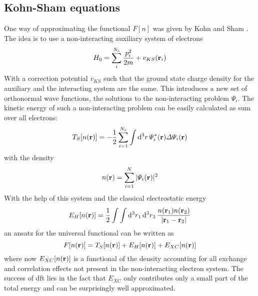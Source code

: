 \documentclass[main.tex]{subfiles}
\begin{document}
\subsection{Kohn-Sham equations}

One way of approximating the functional \(F[n]\) was given by Kohn and Sham \cite{kohn_self-consistent_1965}.
The idea is to use a non-interacting auxiliary system of electrons 
\begin{equation}
    H_0 = \sum_i^{N_e} \frac{p_i^2}{2m} + v_{KS} (\vb{r}_i)
\end{equation}
With a correction potential \(v_{KS}\) such that the ground state charge density for the auxiliary and the interacting system are the same.
This introduces a new set of orthonormal wave functions, the solutions to the non-interacting problem \(\Psi_i\).
The kinetic energy of such a non-interacting problem can be easily calculated as sum over all electrons:
\begin{equation}
    T_S [n(\vb{r})] = - \frac{1}{2} \sum_{i=1}^{N_e} \int \dd[3]{r} \Psi_i^* (\vb{r}) \Delta \Psi_i (\vb{r})
\end{equation}
with the density
\begin{equation}\label{eq:density_ks_states}
    n(\vb{r}) = \sum_{i=1}^N \vert \Psi_i (\vb{r}) \vert^2
\end{equation}
With the help of this system and the classical electrostatic energy 
\begin{equation}
    E_H [n(\vb{r})] = \frac{1}{2} \int \int \dd[3]{r_1} \dd[3]{r_2} \frac{n(\vb{r}_1) n(\vb{r}_2)}{\vert \vb{r}_1 - \vb{r}_2 \vert}
\end{equation}
an ansatz for the universal functional can be written as
\begin{equation}
    F[n(\vb{r})] = T_S [n(\vb{r})] + E_H [n(\vb{r})] + E_{XC} [n(\vb{r})]
\end{equation}
where now \(E_{XC} [n(\vb{r})]\) is a functional of the density accounting for all exchange and correlation effects not present in the non-interacting electron system.
The success of \acrshort{dft} lies in the fact that \(E_{XC}\) only contributes only a small part of the total energy and can be surprisingly well approximated.
\end{document}

